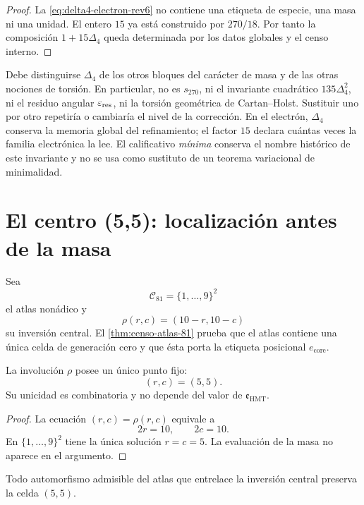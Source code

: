 \begin{proof}
La \cref{eq:delta4-electron-rev6} no contiene una etiqueta de especie, una
masa ni una unidad. El entero \(15\) ya está construido por \(270/18\).
Por tanto la composición \(1+15\Delta_4\) queda determinada por los datos
globales y el censo interno.
\end{proof}

Debe distinguirse \(\Delta_4\) de los otros bloques del carácter de masa y de
las otras nociones de torsión. En particular, no es \(s_{270}\), ni el
invariante cuadrático \(135\Delta_4^2\), ni el residuo angular
\(\varepsilon_{\rm res}\), ni la torsión geométrica de Cartan--Holst.
Sustituir uno por otro repetiría o cambiaría el nivel de la corrección. En el
electrón, \(\Delta_4\) conserva la memoria global del refinamiento; el factor
\(15\) declara cuántas veces la familia electrónica la lee. El calificativo
\emph{mínima} conserva el nombre histórico de este invariante y no se usa
como sustituto de un teorema variacional de minimalidad.

\section{El centro (5,5): localización antes de la masa}

Sea
\[
 \mathcal C_{81}=\{1,\ldots,9\}^2
\]
el atlas nonádico y
\[
 \rho(r,c)=(10-r,10-c)
\]
su inversión central. El \cref{thm:censo-atlas-81} prueba que el atlas
contiene una única celda de generación cero y que ésta porta la etiqueta
posicional \(e_{\mathrm{core}}\).

\begin{proposition}
\label{prop:centro-electron-rev6}
La involución \(\rho\) posee un único punto fijo:
\[
 \boxed{(r,c)=(5,5).}
\]
Su unicidad es combinatoria y no depende del valor de
\(\mathfrak e_{\mathrm{HMT}}\).
\end{proposition}

\begin{proof}
La ecuación \((r,c)=\rho(r,c)\) equivale a
\[
 2r=10,\qquad2c=10.
\]
En \(\{1,\ldots,9\}^2\) tiene la única solución \(r=c=5\). La evaluación
de la masa no aparece en el argumento.
\end{proof}

\begin{corollary}
\label{cor:universalidad-electron-central-rev6}
Todo automorfismo admisible del atlas que entrelace la inversión central
preserva la celda \((5,5)\).
\end{corollary}

